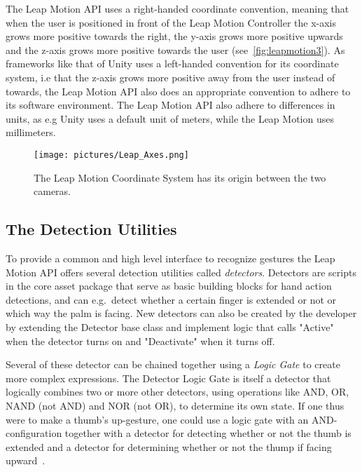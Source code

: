 The Leap Motion API uses a right-handed coordinate convention, meaning that when the user is positioned in front of the Leap Motion Controller the x-axis grows more positive 
towards the right, the y-axis grows more positive upwards and the z-axis grows more positive towards the user (see~\vref{fig:leapmotion3}). 
As frameworks like that of Unity uses a left-handed convention for its coordinate system, i.e that the z-axis grows more positive away from the 
user instead of towards, the Leap Motion API also does an appropriate convention to adhere to its software environment. 
The Leap Motion API also adhere to differences in units, as e.g Unity uses a default unit of meters, while the Leap Motion uses millimeters.

\begin{figure}%
	\texttt{[image: pictures/Leap\_Axes.png]}
	\caption[Leap Motion Coordinates]{The Leap Motion Coordinate System has its origin between the two cameras.}
	\label{fig:leapmotion3}
\end{figure} 

\subsection{The Detection Utilities}
To provide a common and high level interface to recognize gestures the Leap Motion API offers several detection utilities called \textit{detectors}.
Detectors are scripts in the core asset package that serve as basic building blocks for hand action detections, and can e.g.~detect whether a certain finger is extended or not
or which way the palm is facing. New detectors can also be created by the developer by extending
the Detector base class and implement logic that calls "Active" when the detector turns on and "Deactivate" when it turns off.

Several of these detector can be chained together using a \textit{Logic Gate} to create more complex expressions. 
The Detector Logic Gate is itself a detector that logically combines two or more other detectors, using operations like AND, OR, NAND (not AND) and NOR (not OR), 
to determine its own state.
If one thus were to make a thumb's up-gesture, one could use a logic gate with an AND-configuration together with a detector for detecting whether or not the
thumb is extended and a detector for determining whether or not the thump if facing upward~\citep{LeapMotion2016}. 

